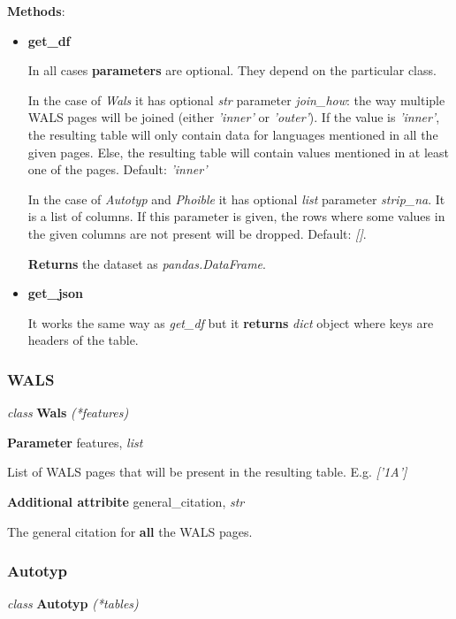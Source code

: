 \documentclass[a4paper,12pt]{article}
\begin{document}
\textbf{Methods}:
\begin{itemize}
 \item \textbf{get\_df}
 
 In all cases \textbf{parameters} are optional. They depend on the particular class.
 
 In the case of \textit{Wals} it has optional \textit{str} parameter \textit{join\_how}: the way multiple WALS pages will be joined (either \textit{'inner'} or \textit{'outer'}). If the value is \textit{'inner'}, the resulting table will only contain data for languages mentioned in all the given pages. Else, the resulting table will contain values mentioned in at least one of the pages. Default: \textit{'inner'}
 
 In the case of \textit{Autotyp} and \textit{Phoible} it has optional \textit{list} parameter \textit{strip\_na}. It is a list of columns. If this parameter is given, the rows where some values in the given columns are not present will be dropped. Default: \textit{[]}.
 
 \textbf{Returns} the dataset as \textit{pandas.DataFrame}.
 
 \item \textbf{get\_json}
 
 It works the same way as \textit{get\_df} but it \textbf{returns} \textit{dict} object where keys are headers of the table.
 
\end{itemize}

\subsubsection{WALS}

\textit{class} \textbf{Wals} \textit{(*features)}
\medskip

\textbf{Parameter} features, \textit{list}

List of WALS pages that will be present in the resulting table. E.g. \textit{['1A']}
\medskip

\textbf{Additional attribite} general\_citation, \textit{str}

The general citation for \textbf{all} the WALS pages.

\subsubsection{Autotyp}

\textit{class} \textbf{Autotyp} \textit{(*tables)}
\medskip
\end{document}
